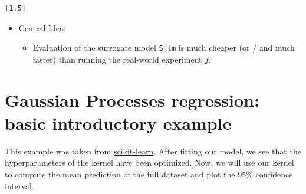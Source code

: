 \documentclass[
  letterpaper,
  DIV=11,
  numbers=noendperiod]{scrreprt}
\providecommand{\tightlist}{%
  \setlength{\itemsep}{0pt}\setlength{\parskip}{0pt}}\usepackage{longtable,booktabs,array}
\begin{document}
\begin{verbatim}
[1.5]
\end{verbatim}

\begin{itemize}
\tightlist
\item
  Central Idea:

  \begin{itemize}
  \tightlist
  \item
    Evaluation of the surrogate model \texttt{S\_lm} is much cheaper (or
    / and much faster) than running the real-world experiment \(f\).
  \end{itemize}
\end{itemize}

\section{Gaussian Processes regression: basic introductory
example}\label{gaussian-processes-regression-basic-introductory-example}

This example was taken from
\href{https://scikit-learn.org/stable/auto_examples/gaussian_process/plot_gpr_noisy_targets.html}{scikit-learn}.
After fitting our model, we see that the hyperparameters of the kernel
have been optimized. Now, we will use our kernel to compute the mean
prediction of the full dataset and plot the 95\% confidence interval.
\end{document}

